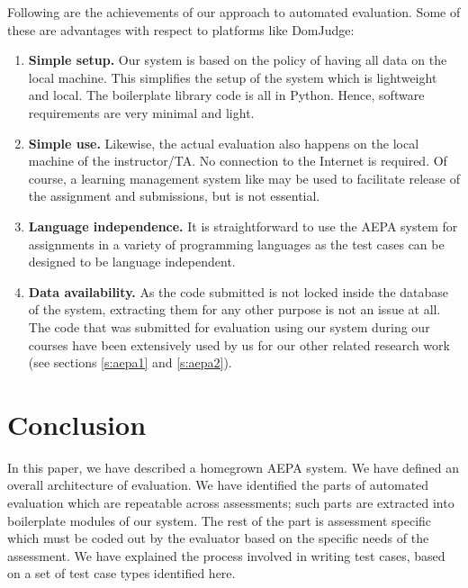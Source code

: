 \documentclass[12pt]{article}
\begin{document}
Following are the achievements of our approach to automated evaluation. Some of these are advantages with respect to platforms like DomJudge:
\begin{enumerate}
\item \textbf{Simple setup.} Our system is based on the policy of having all data on the local machine. This simplifies the setup of the system which is lightweight and local. The boilerplate library code is all in Python. Hence, software requirements are very minimal and light.
\item \textbf{Simple use.} Likewise, the actual evaluation also happens on the local machine of the instructor/TA. No connection to the Internet is required. Of course, a learning management system like \cite{moodle} may be used to facilitate release of the assignment and submissions, but is not essential.
\item \textbf{Language independence.} It is straightforward to use the AEPA system for assignments in a variety of programming languages as the test cases can be designed to be language independent.
\item \textbf{Data availability.} As the code submitted is not locked inside the database of the system, extracting them for any other purpose is not an issue at all. The code that was submitted for evaluation using our system during our courses have been extensively used by us for our other related research work (see sections \ref{s:aepa1} and \ref{s:aepa2}).
\end{enumerate}

\section{Conclusion}
In this paper, we have described a homegrown AEPA system. We have defined an overall architecture of evaluation. We have identified the parts of automated evaluation which are repeatable across assessments; such parts are extracted into boilerplate modules of our system. The rest of the part is assessment specific which must be coded out by the evaluator based on the specific needs of the assessment. We have explained the process involved in writing test cases, based on a set of test case types identified here.
\end{document}
